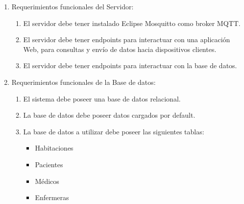\documentclass[
11pt, %
]{charter}
\begin{document}
\begin{enumerate}
	\item Requerimientos funcionales del Servidor:
			\begin{enumerate}
			\item El servidor debe tener instalado Eclipse Mosquitto como broker MQTT.
			\item El servidor debe tener endpoints para interactuar con una aplicación Web, para consultas y envío de datos hacia dispositivos clientes.
			\item El servidor debe tener endpoints para interactuar con la base de datos.

			
			\end{enumerate}
	\item Requerimientos funcionales de la Base de datos:
		\begin{enumerate}		
			\item El sistema debe poseer una base de datos relacional.
			\item La base de datos debe poseer datos cargados por default.
			\item La base de datos a utilizar debe poseer las siguientes tablas:
			\begin{itemize}
			
				\item Habitaciones
						
				\item Pacientes			
			
				\item Médicos
			
				\item Enfermeras			
			

\end{itemize}
\end{enumerate}
\end{enumerate}
\end{document}
